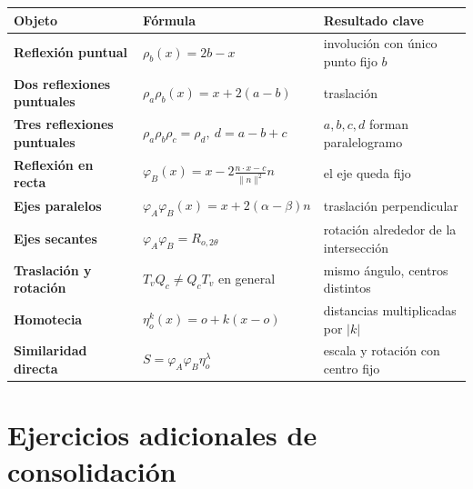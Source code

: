 \begin{center}
\begin{tabularx}{\textwidth}{>{\bfseries}p{31mm} X X}
\toprule
Objeto & Fórmula & Resultado clave\\
\midrule
Reflexión puntual &
\(\rho_b(x)=2b-x\) &
involución con único punto fijo \(b\)\\
Dos reflexiones puntuales &
\(\rho_a\rho_b(x)=x+2(a-b)\) &
traslación\\
Tres reflexiones puntuales &
\(\rho_a\rho_b\rho_c=\rho_d,\ d=a-b+c\) &
\(a,b,c,d\) forman paralelogramo\\
Reflexión en recta &
\(\varphi_B(x)=x-2\frac{n\cdot x-c}{\|n\|^2}n\) &
el eje queda fijo\\
Ejes paralelos &
\(\varphi_A\varphi_B(x)=x+2(\alpha-\beta)n\) &
traslación perpendicular\\
Ejes secantes &
\(\varphi_A\varphi_B=R_{o,2\theta}\) &
rotación alrededor de la intersección\\
Traslación y rotación &
\(T_vQ_c\neq Q_cT_v\) en general &
mismo ángulo, centros distintos\\
Homotecia &
\(\eta_o^k(x)=o+k(x-o)\) &
distancias multiplicadas por \(|k|\)\\
Similaridad directa &
\(S=\varphi_A\varphi_B\eta_o^\lambda\) &
escala y rotación con centro fijo\\
\bottomrule
\end{tabularx}
\end{center}

\section{Ejercicios adicionales de consolidación}

